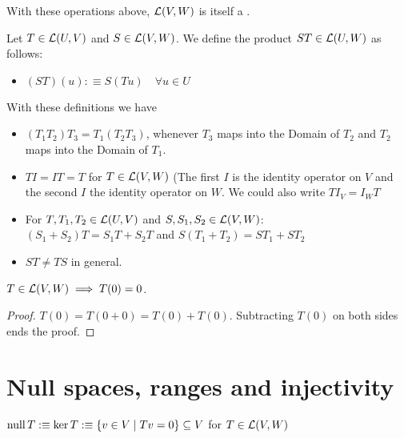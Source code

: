 \setcounter{thm}{5}
\begin{thm}
    With these operations above, ${\mathcal{L}(V,W)}$ is itself a \vs.
\end{thm}

\setcounter{thm}{6}
\begin{mydef}
    Let $T \in {\mathcal{L}(U, V)}$ and $S \in {\mathcal{L}(V, W)}$. We define the product $ST \in {\mathcal{L}(U, W)}$ as follows:
    \begin{itemize}
    	\item[] $(ST)(u) :\equiv S(Tu) \quad \forall u \in U$
    \end{itemize}
\end{mydef}

\begin{thm}
    With these definitions we have
    \begin{itemize}
    	\item {} $(T_1 T_2) T_3 = T_1 (T_2 T_3)$, whenever $T_3$ maps into the Domain of $T_2$ and $T_2$ maps into the Domain of $T_1$.
    	\item {} $T I = I T = T$ for $T \in {\mathcal{L}(V,W)}$ (The first $I$ is the identity operator on $V$ and the second $I$ the identity operator on $W$. We could also write $T I_V = I_W T$
    	\item {} For $T, T_1, T_2 \in {\mathcal{L}(U, V)}$ and $S, S_1, S_2 \in {\mathcal{L}(V, W)}$: \\ $(S_1 + S_2)T=S_1 T + S_2 T$ and $S(T_1 + T_2)=S T_1 + S T_2$
    	\item {} $ST \neq TS$ in general.
    \end{itemize}
\end{thm}

\setcounter{thm}{9}
\begin{thm}
     $T\in {\mathcal{L}(V,W)} \implies T(0)=0$. 
\end{thm}
\begin{proof}
    $T(0) = T(0+0) = T(0) + T(0)$. Subtracting $T(0)$ on both sides ends the proof.
\end{proof}

\pagebreak

\section{Null spaces, ranges and injectivity}

\begin{mydef}
    $\operatorname{null} T :\equiv \ker T :\equiv \{ v \in V \mid Tv=0\} \subseteq V$ for $T \in {\mathcal{L}(V,W)}$
\end{mydef}

